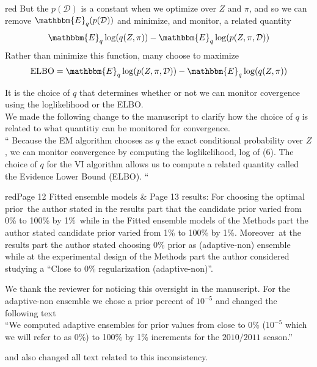 \documentclass[
  fontsize=11pt,
  paper=a4,
  parskip=half,
  enlargefirstpage=on,    %
  fromalign=right,        %
  fromphone=on,           %
  fromrule=aftername,     %
  addrfield=on,           %
  backaddress=on,         %
  subject=beforeopening,  %
  locfield=narrow,        %
  foldmarks=on,           %
]{scrlttr2}
\begin{document}
\begin{commt}{red}
      But the $p(\mathcal{D})$ is a constant when we optimize over $Z$ and $\pi$, and so we can remove  {$\mathbbm{E}_{q} ( p(\mathcal{D}) )$} and minimize, and monitor, a related quantity
      \begin{align*}
        \mathbbm{E}_{q}\log(q(Z,\pi)) - \mathbbm{E}_{q}\log(  p(Z,\pi, \mathcal{D}) )
      \end{align*}
      Rather than minimize this function, many choose to maximize
       \begin{align*}
        \text{ELBO} =  \mathbbm{E}_{q}\log(  p(Z,\pi, \mathcal{D}) ) - \mathbbm{E}_{q}\log(q(Z,\pi)) 
      \end{align*}

      It is the choice of $q$ that determines whether or not we can monitor covergence using the loglikelihood or the ELBO.\\

      We made the following change to the manuscript to clarify how the choice of $q$ is related to what quantitiy can be monitored for convergence.\\

      {``
      Because the EM algorithm chooses as $q$ the exact conditional probability over $Z$, we can monitor convergence by computing the loglikelihood, log of (6).
      The choice of $q$ for the VI algorithm allows us to compute a related quantity called the Evidence Lower Bound (ELBO).
      ``}
      
    \end{commt}


    \begin{commt}{red}{Page 12 Fitted ensemble models \& Page 13 results: For choosing the optimal prior\, the author stated in the results part that the candidate prior varied from 0\% to 100\% by 1\%\, while in the Fitted ensemble models of the Methods part the author stated candidate prior varied from 1\% to 100\% by 1\%. Moreover\, at the results part the author stated choosing 0\% prior as (adaptive-non) ensemble while at the experimental design of the Methods part the author considered studying a ``Close to 0\% regularization (adaptive-non)''.}

      We thank the reviewer for noticing this oversight in the manuscript. For the adaptive-non ensemble we chose a prior percent of $10^{-5}$ and changed the following text\\

      ``We computed adaptive ensembles for prior values from close to 0\% ({$10^{-5}$} which we will refer to as {$0\%$}) to 100\% by 1\% increments for the $2010/2011$ season.''

      and also changed all text related to this inconsistency.
    \end{commt}
\end{document}
